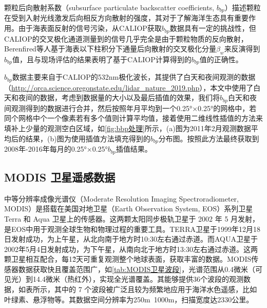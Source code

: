 颗粒后向散射系数（subsurface particulate backscatter coefficients, $b_{bp}$）描述颗粒在受到入射光线激发后向相反方向散射的强度，其对于了解海洋生态具有重要作用。由于海表面反射的信号污染，从CALIOP获取$b_{bp}$数据具有一定的挑战性，但CALIOP的交叉极化通道测量到的信号几乎完全是由于颗粒物质的反向散射，Berenfired等人\cite{2013Space}基于海表以下柱积分下通量后向散射的交叉极化分量$\beta _ w$来反演得到$b_{bp}$值，且与现场评估的结果表明了基于CALIOP计算得到的$b_{bp}$值的正确性。

$b_{bp}$数据主要来自于CALIOP的532nm极化波长，其提供了白天和夜间观测的数据（\url{http://orca.science.oregonstate.edu/lidar_nature_2019.php}）\cite{behrenfeld2019global}，本文中使用了白天和夜间的数据，考虑到数据量的大小以及最后插值的效果，我们将$b_{bp}$白天和夜间观测得到的数据进行合并，然后按照年月平均到一个0.25°×0.25°的网格中，若同个网格中个一个像素若有多个值则计算平均值，接着使用二维线性插值的方法来填补上少量的观测空白区域，如\autoref{fig:bbp处理}所示，(a)图为2011年2月观测数据平均后的结果，(b)图为使用插值方法填充得到的$b_{bp}$分布图。按照此方法最终获取到2008年-2016年每月的0.25°×0.25°$b_{bp}$插值结果。

\subsection{MODIS 卫星遥感数据}
中等分辨率成像光谱仪（Moderate Resolution Imaging Spectroradiometer, MODIS）是搭载在美国对地卫星（Earth Observation System, EOS）系列卫星 Terra 和 Aqua 卫星上的传感器。这两颗太阳同步极轨卫星于 2002 年 5 月发射，是EOS中用于观测全球生物和物理过程的重要工具。TERRA卫星于1999年12月18日发射成功，为上午星，从北向南于地方时10:30左右通过赤道。而AQUA卫星于2002年5月4日发射成功，为下午星，从南向北于地方时13:30左右通过赤道。这两颗卫星相互配合，每1\~2天可重复观测整个地球表面，获取丰富的数据。MODIS传感器数据获取快且覆盖范围广，如\autoref{tab:MODIS卫星波段}，光谱范围从0.4微米（可见光）到14.4微米（热红外），实现全光谱覆盖。其能够提供36个波段的观测数据，如表所示，其中的 7 个波段被广泛且较为频繁地应用于海洋水色遥感，比如叶绿素、悬浮物等。其数据空间分辨率为250m~1000m，扫描宽度达2330公里。

